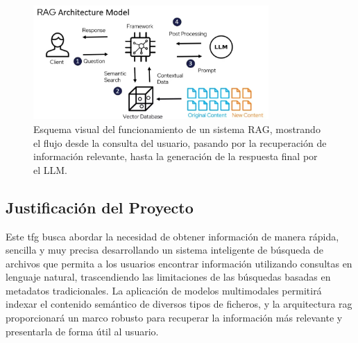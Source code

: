 \bigskip %
\begin{figure}[H] %
    \centering %
    \includegraphics[width=0.8\textwidth]{archivos/RAG_scheme.png} %
    \caption[Esquema de un sistema RAG]{Esquema visual del funcionamiento de un sistema RAG, mostrando el flujo desde la consulta del usuario, pasando por la recuperación de información relevante, hasta la generación de la respuesta final por el LLM.}
    \label{fig:rag_scheme} %
\end{figure}
\bigskip %

\subsection{Justificación del Proyecto}
Este \gls{tfg} busca abordar la necesidad de obtener información de manera rápida, sencilla y muy precisa desarrollando un sistema inteligente de búsqueda de archivos que permita a los usuarios encontrar información utilizando consultas en lenguaje natural, trascendiendo las limitaciones de las búsquedas basadas en metadatos tradicionales. La aplicación de modelos multimodales permitirá indexar el contenido semántico de diversos tipos de ficheros, y la arquitectura \gls{rag} proporcionará un marco robusto para recuperar la información más relevante y presentarla de forma útil al usuario.